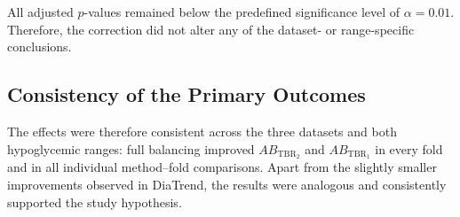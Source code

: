 \begin{table}[htbp]
\centering
\caption{Original and Holm-adjusted $p$-values for the primary statistical outcomes.}
\label{tab:holm_adjusted_primary_results}
\end{table}

All adjusted $p$-values remained below the predefined significance level of $\alpha = 0.01$. Therefore, the correction did not alter any of the dataset- or range-specific conclusions.

\subsection{Consistency of the Primary Outcomes}
\label{subsec:primary_outcome_consistency}

The effects were therefore consistent across the three datasets and both hypoglycemic ranges: full balancing improved $AB_{\mathrm{TBR_2}}$ and $AB_{\mathrm{TBR_1}}$ in every fold and in all individual method--fold comparisons. Apart from the slightly smaller improvements observed in DiaTrend, the results were analogous and consistently supported the study hypothesis.

